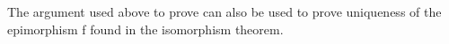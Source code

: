 \begin{code}
\AgdaDottedPattern{\AgdaSymbol{)}}\AgdaSpace{}%
\AgdaOperator{\AgdaInductiveConstructor{,}}\AgdaSpace{}%
\AgdaSpace{}%
\AgdaOperator{\AgdaInductiveConstructor{,}}\AgdaSpace{}%
\AgdaSymbol{)}\AgdaSpace{}%
\AgdaSpace{}%
\AgdaSymbol{=}\<%
\\
\>[2][@{}l@{\AgdaIndent{0}}]%
\>[3]\AgdaSpace{}%
\AgdaSymbol{\{}\AgdaSpace{}%
\AgdaSymbol{=}\AgdaSpace{}%
\AgdaSpace{}%
\AgdaSpace{}%
\AgdaSpace{}%
\AgdaSpace{}%
\AgdaSpace{}%
\AgdaOperator{\AgdaInductiveConstructor{,}}\AgdaSpace{}%
\AgdaSymbol{\}}\AgdaSpace{}%
\AgdaSpace{}%
\AgdaSpace{}%
\AgdaSymbol{(}\AgdaSpace{}%
\AgdaSymbol{)}\AgdaSpace{}%
\<%
\\
%
\\[\AgdaEmptyExtraSkip]%
%
\>[2]\AgdaSpace{}%
\AgdaSymbol{:}\AgdaSpace{}%
\AgdaSpace{}%
\<%
\\
%
\>[2]\AgdaSpace{}%
\AgdaSymbol{=}\AgdaSpace{}%
\AgdaSpace{}%
\AgdaSpace{}%
\AgdaSpace{}%
\<%
\end{code}
\ccpad
The argument used above to prove  can also be used to prove uniqueness of the epimorphism \ab f found in the isomorphism theorem.
\ccpad

